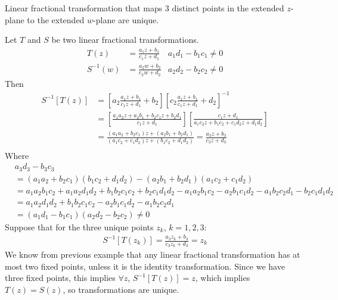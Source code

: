 \documentclass[12pt, english]{book}
\makeatletter
\renewenvironment{proof}[1][\proofname]{\par
	\pushQED{\qed}%
	\normalfont \topsep6\p@\@plus6\p@\relax
	\list{}{%
		\settowidth{\leftmargin}{\itshape\proofname:\hskip\labelsep}%
		\setlength{\labelwidth}{0pt}%
		\setlength{\itemindent}{-\leftmargin}%
	}%
	\item[\hskip\labelsep\itshape#1\@addpunct{:}]\ignorespaces
	}{ \popQED\endlist\@endpefalse}
\makeatother
\begin{document}
	\begin{example}Linear fractional transformation that maps 3 distinct points in the extended \(z\)-plane to the extended \(w\)-plane are unique.
		\begin{proof}
			{\color{Grey}
			Let \(T\) and \(S\) be two linear fractional transformations.
			\begin{align*}
				T(z) &= \frac{a_1 z + b_1}{c_1 z + d_1}
					& a_1 d_1 - b_1 c_1 \neq 0 \\
				S^{-1}(w) &= \frac{a_2 w + b_2}{c_2 w + d_2}
					& a_2 d_2 - b_2 c_2 \neq 0
			\end{align*}
			Then
			\begin{align*}
				S^{-1}[T(z)] 
				&= \left[a_2 \frac{a_1 z + b_1}{c_1 z + d_1} + b_2\right]\left[c_2 \frac{a_1 z + b_1}{c_1 z + d_1} + d_2\right]^{-1} \\
				&= \left[\frac{a_1 a_2 z + a_2 b_1 + b_2 c_1 z + b_2 d_1}{c_1 z + d_1}\right]\left[\frac{c_1 z + d_1}{a_1 c_2 z + b_1 c_2 + c_1 d_2 z + d_1 d_2}\right] \\
				&= \frac{(a_1 a_2 + b_2 c_1)z + (a_2 b_1 + b_2 d_1)}{(a_1 c_2 + c_1 d_2)z + (b_1 c_2 + d_1 d_2)}
				 = \frac{a_3 z + b_3}{c_3 z + d_3} \\
			\end{align*}
			Where
			\begin{align*}
				& a_3 d_3 - b_3 c_3 \\
				&= (a_1 a_2 + b_2 c_1)(b_1 c_2 + d_1 d_2) - (a_2 b_1 + b_2 d_1)(a_1 c_2 + c_1 d_2) \\
				&= a_1 a_2 b_1 c_2 + a_1 a_2 d_1 d_2 + b_1 b_2 c_1 c_2 + b_2 c_1 d_1 d_2 - a_1 a_2 b_1 c_2 - a_2 b_1 c_1 d_2 - a_1 b_2 c_2 d_1 - b_2 c_1 d_1 d_2 \\
				&= a_1 a_2 d_1 d_2 + b_1 b_2 c_1 c_2 - a_2 b_1 c_1 d_2 - a_1 b_2 c_2 d_1 \\
				&= (a_1 d_1 - b_1 c_1)(a_2 d_2 - b_2 c_2) \neq 0
			\end{align*}
			Suppose that for the three unique points \(z_k\), \(k = 1, 2, 3\):
			\begin{align*}
				S^{-1}[T(z_k)] = \frac{a_3 z_k + b_3}{c_3 z_k + d_3} = z_k
			\end{align*}
			We know from previous example that any linear fractional transformation has at most two fixed points, unless it is the identity transformation. Since we have three fixed points, this implies \(\forall z\), \(S^{-1}[T(z)] = z\), which implies \(T(z) = S(z)\), so transformations are unique.
			}
		\end{proof}
	\end{example}
	
\end{document}
